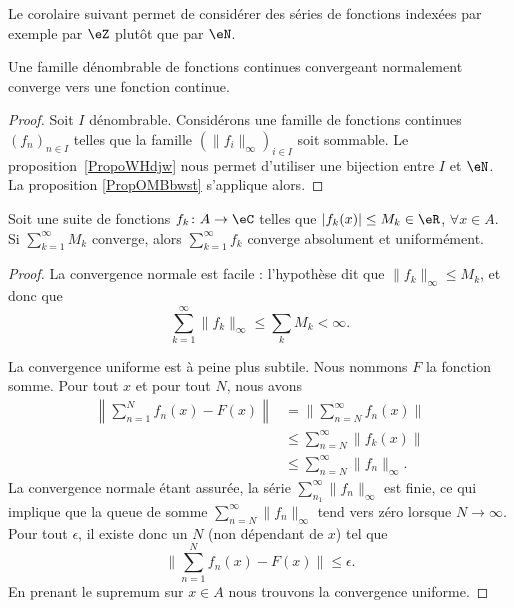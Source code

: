 Le corolaire suivant permet de considérer des séries de fonctions indexées par exemple par \( \eZ\) plutôt que par \( \eN\).
\begin{corollary}
	Une famille dénombrable de fonctions continues convergeant normalement converge vers une fonction continue.
\end{corollary}

\begin{proof}
	Soit \( I\) dénombrable. Considérons une famille de fonctions continues \( (f_n)_{n\in I}\) telles que la famille \( (\| f_i \|_{\infty})_{i\in I}\) soit sommable. Le proposition~\ref{PropoWHdjw} nous permet d'utiliser une bijection entre \( I\) et \( \eN\). La proposition \ref{PropOMBbwst} s'applique alors.
\end{proof}

\begin{theorem}		\label{ThoCritWeierstrass}
	Soit une suite de fonctions \( f_k\colon A\to \eC\) telles que \( | f_k(x) |\leq M_k\in\eR\), \( \forall x\in A\). Si \( \sum_{k=1}^{\infty}M_k\) converge, alors \( \sum_{k=1}^{\infty}f_k\) converge absolument et uniformément.
\end{theorem}

\begin{proof}
	La convergence normale est facile : l'hypothèse dit que \( \| f_k \|_{\infty}\leq M_k\), et donc que
	\begin{equation}
		\sum_{k=1}^{\infty}\| f_k \|_{\infty}\leq \sum_kM_k<\infty.
	\end{equation}

	La convergence uniforme est à peine plus subtile. Nous nommons \( F\) la fonction somme. Pour tout \( x\) et pour tout \( N\), nous avons
	\begin{subequations}
		\begin{align}
			\left\| \sum_{n=1}^Nf_n(x)-F(x) \right\| & =\| \sum_{n=N}^{\infty}f_n(x) \|            \\
			                                         & \leq\sum_{n=N}^{\infty}\| f_k(x) \|         \\
			                                         & \leq \sum_{n=N}^{\infty}\| f_n \|_{\infty}.
		\end{align}
	\end{subequations}
	La convergence normale étant assurée, la série \( \sum_{n_1}^{\infty}\| f_n \|_{\infty}\) est finie, ce qui implique que la queue de somme \( \sum_{n=N}^{\infty}\| f_n \|_{\infty}\) tend vers zéro lorsque \( N\to \infty\). Pour tout \( \epsilon\), il existe donc un \( N\) (non dépendant de \( x\)) tel que
	\begin{equation}
		\| \sum_{n=1}^Nf_n(x)-F(x) \|\leq \epsilon.
	\end{equation}
	En prenant le supremum sur \( x\in A\) nous trouvons la convergence uniforme.
\end{proof}

